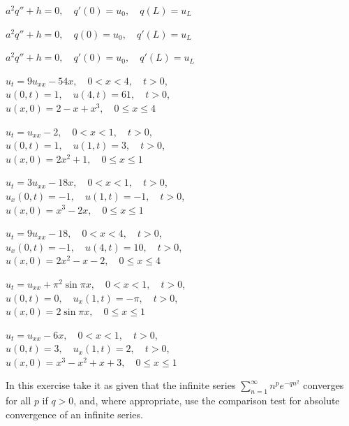 \begin{exerciselist}
\begin{alist}
    \item %
    $a^{2}q''+h=0,\quad q'(0)=u_{0},\quad q(L)=u_{L}$

    \item %
    $a^{2}q''+h=0,\quad q(0)=u_{0},\quad q'(L)=u_{L}$

    \item %
    $a^{2}q''+h=0,\quad q'(0)=u_{0},\quad q'(L)=u_{L}$
  \end{alist}


  \item\label{exer:12.1.48} $u_{t}=9u_{xx}-54x,\quad0<x<4,\quad t>0$,\\ $u(0,t)=1,\quad u(4,t)=61,\quad t>0$,\\ $u(x,0)=2-x+x^{3},\quad0\le x\le4$

  \item\label{exer:12.1.49} $u_{t}=u_{xx}-2,\quad0<x<1,\quad t>0$,\\ $u(0,t)=1,\quad u(1,t)=3,\quad t>0$,\\ $u(x,0)=2x^{2}+1,\quad0\le x\le1$

  \item\label{exer:12.1.50} $u_{t}=3u_{xx}-18x,\quad0<x<1,\quad t>0$,\\ $u_{x}(0,t)=-1,\quad u(1,t)=-1,\quad t>0$,\\ $u(x,0)=x^{3}-2x,\quad0\le x\le1$

  \item\label{exer:12.1.51} $u_{t}=9u_{xx}-18,\quad0<x<4,\quad t>0$,\\ $u_{x}(0,t)=-1,\quad u(4,t)=10,\quad t>0$,\\ $u(x,0)=2x^{2}-x-2,\quad0\le x\le4$

  \item\label{exer:12.1.52} $u_{t}=u_{xx}+\pi^{2}\sin\pi x,\quad0<x<1,\quad t>0$,\\ $u(0,t)=0,\quad u_{x}(1,t)=-\pi,\quad t>0$,\\ $u(x,0)=2\sin\pi x,\quad0\le x\le1$

  \item\label{exer:12.1.53} $u_{t}=u_{xx}-6x,\quad0<x<1,\quad t>0$,\\ $u(0,t)=3,\quad u_{x}(1,t)=2,\quad t>0$,\\ $u(x,0)=x^{3}-x^{2}+x+3,\quad0\le x\le1$

  \item\label{exer:12.1.54} In this exercise take it as given that the infinite series
        $\sum_{n=1}^{\infty}n^{p}e^{-qn^{2}}$ converges for all $p$ if $q>0$, and, where
        appropriate, use the comparison test for absolute convergence of an infinite series.


\end{exerciselist}
